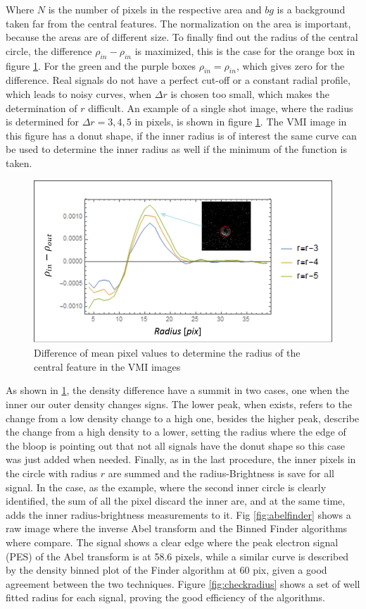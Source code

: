 Where $N$ is the number of pixels in the respective area and $bg$ is a background taken far from the central features. The normalization on the area is important, because the areas are of different size. To finally find out the radius of the central circle, the difference $\rho_{in}-\rho_{in}$ is maximized, this is the case for the orange box in figure \ref{fig:density_plot}. For the green and the purple boxes $\rho_{in} = \rho_{in}$, which gives zero for the difference.
Real signals do not have a perfect cut-off or a constant radial profile, which leads to noisy curves, when $\Delta r$ is chosen too small, which makes the determination of $r$ difficult. An example of a single shot image, where the radius is determined for $\Delta r = 3,4,5$ in pixels, is shown in figure \ref{fig:density_plot}. The VMI image in this figure has a donut shape, if the inner radius is of interest the same curve can be used to determine the inner radius as well if the minimum of the function is taken.
\begin{figure}

\centering
\includegraphics[width=10 cm]{../images/density_plot.png}
\caption{Difference of mean pixel values to determine the radius of the central feature in the VMI images}
\label{fig:density_plot}
\end{figure}

As shown in \ref{fig:density_plot}, the density difference have a summit in two cases, one when the inner our outer density changes signs. The lower peak, when exists, refers to the change from a low density change to a high one, besides the higher peak, describe the change from a high density to a lower, setting the radius where the edge of the bloop is pointing out that not all signals have the donut shape so this case was just added when needed. Finally, as in the last procedure, the inner pixels in the circle with radius $r$ are summed and the radius-Brightness is save for all signal. In the case, as the example, where the second inner circle is clearly identified, the sum of all the pixel discard the inner are, and at the same time, adds the inner radius-brightness measurements to it. 
Fig \ref{fig:abelfinder} shows a raw image where the inverse Abel transform and the Binned Finder algorithms where compare. The signal shows a clear edge where the peak electron signal (PES) of the Abel transform is at 58.6 pixels, while a similar curve is described by the density binned plot of the Finder algorithm at 60 pix, given a good agreement between the two techniques.
Figure \ref{fig:checkradius} shows a set of well fitted radius for each signal, proving the good efficiency of the algorithms. 

